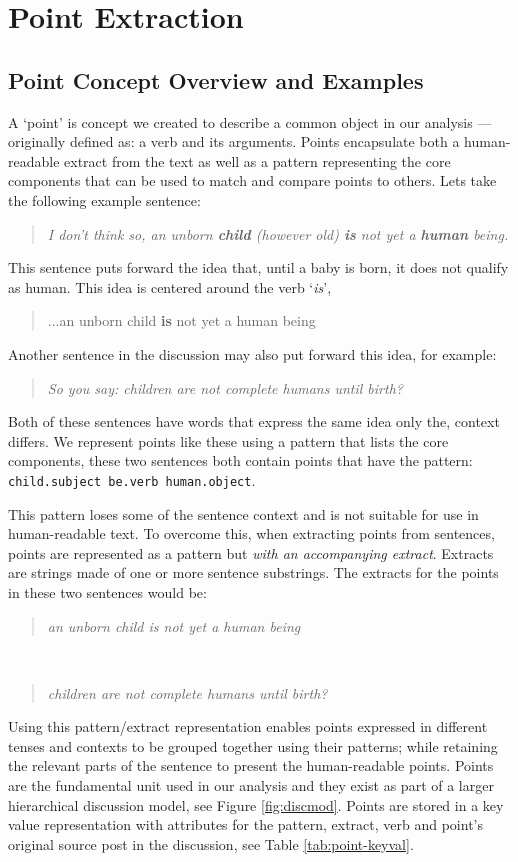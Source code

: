 \chapter{Point Extraction\label{chap:point-extraction}}
  \section{Point Concept Overview and Examples}
    A `point' is concept we created to describe a common object in our analysis --- originally defined as: a verb and its arguments. Points encapsulate both a human-readable extract from the text as well as a pattern representing the core components that can be used to match and compare points to others. Lets take the following example sentence:

    \smallskip
    \begin{center}
      \blockquote{\textit{I don't think so, an unborn \textbf{child} (however old) \textbf{is} not yet a \textbf{human} being.}}
    \end{center}
    \smallskip

    This sentence puts forward the idea that, until a baby is born, it does not qualify as human. This idea is centered around the verb `\textit{is}', \blockquote{...an unborn child \textbf{is} not yet a human being}. Another sentence in the discussion may also put forward this idea, for example: \blockquote{\textit{So you say: children are not complete humans until birth?}}. Both of these sentences have words that express the same idea only the, context differs. We represent points like these using a pattern that lists the core components, these two sentences both contain points that have the pattern: \texttt{child.subject be.verb human.object}.

    This pattern loses some of the sentence context and is not suitable for use in human-readable text. To overcome this, when extracting points from sentences, points are represented as a pattern but \textit{with an accompanying extract}. Extracts are strings made of one or more sentence substrings. The extracts for the points in these two sentences would be:

    \smallskip
    \begin{center}
      \blockquote{\textit{an unborn child is not yet a human being}} \\ \blockquote{\textit{children are not complete humans until birth?}}
    \end{center}
    \smallskip

    Using this pattern/extract representation enables points expressed in different tenses and contexts to be grouped together using their patterns; while retaining the relevant parts of the sentence to present the human-readable points. Points are the fundamental unit used in our analysis and they exist as part of a larger hierarchical discussion model, see Figure \ref{fig:discmod}. Points are stored in a key value representation with attributes for the pattern, extract, verb and point's original source post in the discussion, see Table \ref{tab:point-keyval}.

